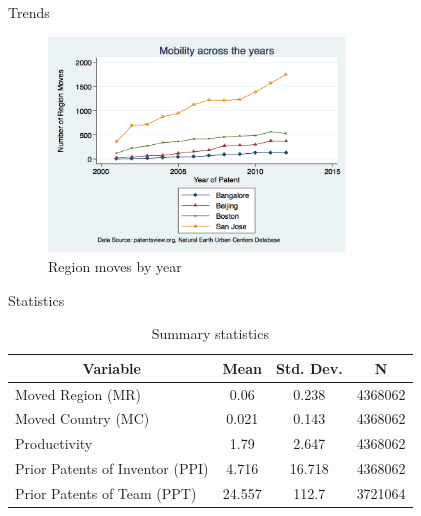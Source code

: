 \documentclass{beamer}
\begin{document}
\begin{frame}{Trends}{}
\begin{figure}[h]
\begin{centering}
  \includegraphics[width=0.7\textwidth]{regionmoves}
  \caption{Region moves by year}
   \label{fig:regionmoves}
\end{centering}
\end{figure}
\end{frame}

\begin{frame}{Statistics}{}
\begin{table}[htbp]\centering \caption{Summary statistics \label{sumstat}}
\begin{tabular}{l c c  c}\hline\hline
\multicolumn{1}{c}{\textbf{Variable}} & \textbf{Mean}
 & \textbf{Std. Dev.} & \textbf{N}\\ \hline
Moved Region (MR) & 0.06 & 0.238  & 4368062\\
Moved Country (MC) & 0.021 & 0.143  & 4368062\\
Productivity & 1.79 & 2.647  & 4368062\\
Prior Patents of Inventor (PPI) & 4.716 & 16.718  & 4368062\\
Prior Patents of Team (PPT) & 24.557 & 112.7  & 3721064\\
\hline
\end{tabular}
\end{table}
\end{frame}
\end{document}
